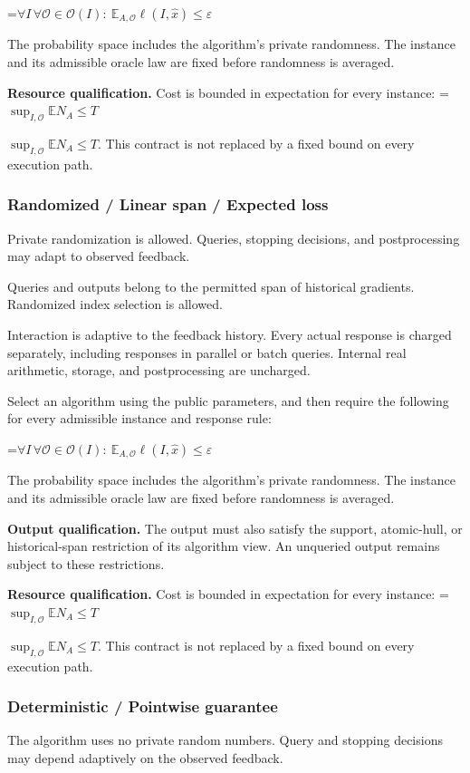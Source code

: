 \documentclass[10pt,a4paper]{article}
\newcommand{\AtlasMath}[1]{\par\begingroup\centering\setbox0=\hbox{$\displaystyle #1$}\ifdim\wd0>1.4\linewidth\typeout{ATLAS WIDE FORMULA: \the\wd0}\fi\ifdim\wd0>\linewidth\resizebox{\linewidth}{!}{\box0}\else\box0\fi\par\endgroup}
\newcommand{\AtlasInlineMath}[1]{\begingroup\setbox0=\hbox{$#1$}\ifdim\wd0>.4\linewidth\endgroup\AtlasMath{#1}\else\endgroup$#1$\fi}
\begin{document}
\AtlasMath{\forall I\,\forall\mathcal{O}\in\mathcal{O}(I):\ \mathbb{E}_{A,\mathcal{O}}\ell(I,\widehat{x})\le\varepsilon}


The probability space includes the algorithm's private randomness. The instance and its admissible oracle law are fixed before randomness is averaged.

\textbf{Resource qualification.} Cost is bounded in expectation for every instance: \AtlasInlineMath{\sup_{I,\mathcal O}\mathbb E N_A\le T}. This contract is not replaced by a fixed bound on every execution path.

\subsubsection{Randomized / Linear span / Expected loss}
Private randomization is allowed. Queries, stopping decisions, and postprocessing may adapt to observed feedback.

Queries and outputs belong to the permitted span of historical gradients. Randomized index selection is allowed.

Interaction is adaptive to the feedback history. Every actual response is charged separately, including responses in parallel or batch queries. Internal real arithmetic, storage, and postprocessing are uncharged.

Select an algorithm using the public parameters, and then require the following for every admissible instance and response rule:


\AtlasMath{\forall I\,\forall\mathcal{O}\in\mathcal{O}(I):\ \mathbb{E}_{A,\mathcal{O}}\ell(I,\widehat{x})\le\varepsilon}


The probability space includes the algorithm's private randomness. The instance and its admissible oracle law are fixed before randomness is averaged.

\textbf{Output qualification.} The output must also satisfy the support, atomic-hull, or historical-span restriction of its algorithm view. An unqueried output remains subject to these restrictions.

\textbf{Resource qualification.} Cost is bounded in expectation for every instance: \AtlasInlineMath{\sup_{I,\mathcal O}\mathbb E N_A\le T}. This contract is not replaced by a fixed bound on every execution path.

\subsubsection{Deterministic / Pointwise guarantee}
The algorithm uses no private random numbers. Query and stopping decisions may depend adaptively on the observed feedback.
\end{document}
